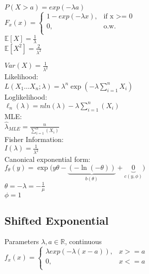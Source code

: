 $P(X>a)= exp(-\lambda a)$\\

$ F_x(x)=
	\begin{cases}
		 1-exp(-\lambda x),&\text{if x >= 0}\\
		0,&\text{o.w.}\\
	\end{cases}
$\\

$\mathbb{E}[X]=\frac{1}{\lambda}$\\

$\mathbb{E}[X^2]=\frac{2}{\lambda^2}$

$Var(X)=\frac{1}{\lambda^2}$\\

Likelihood:\\
$L(X_1\dots X_n;\lambda)=\lambda^n\exp\left(-\lambda\sum_{i=1}^n X_i\right)$\\

Loglikelihood:\\

$\ell_n (\lambda)= n ln(\lambda) - \lambda \sum_{i=1}^n (X_i)$\\

MLE:\\

$\hat{\lambda}_{MLE}= \frac{n}{\sum^{n}_{i=1}(X_i)}$\\

Fisher Information:\\

$I(\lambda)= \frac{1}{\lambda^2}$\\

Canonical exponential form:\\

$f_{\theta}(y) = \exp\big(y\theta - \underbrace{(-\ln(-\theta))}_{b(\theta)} + \underbrace{0}_{c(y, \phi)}\big)$\\

$\theta = -\lambda = -\frac1{\mu}$\\

$\phi = 1$


\subsection*{Shifted Exponential}

Parameters $\lambda, a \in \mathbb{R}$, continuous\\
$ f_x(x)=
	\begin{cases}
		 \lambda exp(-\lambda(x - a )),&{x >= a}\\
		0,&{x <= a}\\
	\end{cases}
$\\

